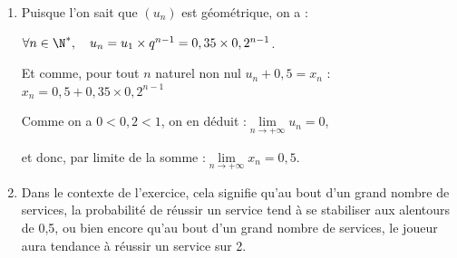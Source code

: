 \begin{enumerate}
\begin{enumerate}
	\item Puisque l'on sait que $(u_n)$ est géométrique, on a :

$\forall n \in \N^*,\quad u_n = u_1 \times q^{n-1} = 0,35 \times 0,2^{n-1}$.

Et comme, pour tout $n$ naturel non nul $u_n + 0,5 = x_n$ :\quad $x_n = 0,5 + 0,35 \times 0,2^{n-1}$

Comme on a $0 < 0,2 < 1$, on en déduit :\quad$\lim\limits_{n \to +\infty} u_n = 0$,

	et donc, par limite de la somme :\quad $\lim\limits_{n \to +\infty} x_n = 0,5$.


	\item Dans le contexte de l'exercice, cela signifie qu'au bout d'un grand nombre de services, la probabilité de réussir un service tend à se stabiliser aux alentours de 0,5, ou bien encore qu'au bout d'un grand nombre de services, le joueur aura tendance à réussir un service sur 2.
\end{enumerate}
\end{enumerate}
